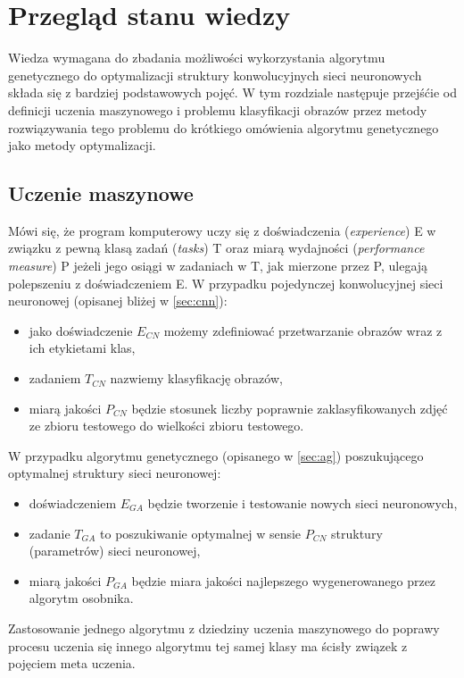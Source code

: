 \chapter{Przegląd stanu wiedzy}\label{chap:teoria}
Wiedza wymagana do zbadania możliwości wykorzystania algorytmu genetycznego do optymalizacji struktury konwolucyjnych sieci neuronowych składa się z bardziej podstawowych pojęć.
W tym rozdziale następuje przejśćie od definicji uczenia maszynowego i problemu klasyfikacji obrazów przez metody rozwiązywania tego problemu do krótkiego omówienia algorytmu genetycznego jako metody optymalizacji.
\section{Uczenie maszynowe}\label{machine_learning}
Mówi się, że program komputerowy uczy się z doświadczenia (\textit{experience}) E w związku z pewną klasą zadań (\textit{tasks}) T oraz miarą wydajności (\textit{performance measure}) P jeżeli jego osiągi w zadaniach w T, jak mierzone przez P, ulegają polepszeniu z doświadczeniem E. \cite{mitchell1997machine}
W przypadku pojedynczej konwolucyjnej sieci neuronowej (opisanej bliżej w \ref{sec:cnn}):
\begin{itemize}
	\item jako doświadczenie $E_{CN}$ możemy zdefiniować przetwarzanie obrazów wraz z ich etykietami klas,
	\item zadaniem $T_{CN}$ nazwiemy klasyfikację obrazów,
	\item miarą jakości $P_{CN}$ będzie stosunek liczby poprawnie zaklasyfikowanych zdjęć ze zbioru testowego do wielkości zbioru testowego.
\end{itemize}
W przypadku algorytmu genetycznego (opisanego w \ref{sec:ag}) poszukującego optymalnej struktury sieci neuronowej:
\begin{itemize}
	\item doświadczeniem $E_{GA}$ będzie tworzenie i testowanie nowych sieci neuronowych,
	\item zadanie $T_{GA}$ to poszukiwanie optymalnej w sensie $P_{CN}$ struktury (parametrów) sieci neuronowej,
	\item miarą jakości $P_{GA}$ będzie miara jakości najlepszego wygenerowanego przez algorytm osobnika.
\end{itemize}
Zastosowanie jednego algorytmu z dziedziny uczenia maszynowego do poprawy procesu uczenia się innego algorytmu tej samej klasy ma ścisły związek z pojęciem meta uczenia.
